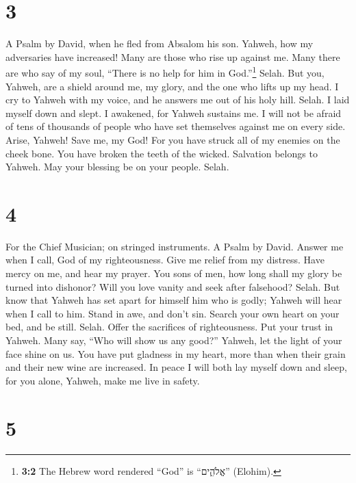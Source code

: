 \hypertarget{section-2}{%
\section{3}\label{section-2}}

A Psalm by David, when he fled from Absalom his son. 
Yahweh, how my adversaries have increased! Many are those who rise up
against me.  Many there are who say of my soul, ``There is
no help for him in God.''\footnote{\textbf{3:2} The Hebrew word rendered
  ``God'' is ``אֱלֹהִ֑ים'' (Elohim).} Selah.  But you,
Yahweh, are a shield around me, my glory, and the one who lifts up my
head.  I cry to Yahweh with my voice, and he answers me
out of his holy hill. Selah.  I laid myself down and
slept. I awakened, for Yahweh sustains me.  I will not be
afraid of tens of thousands of people who have set themselves against me
on every side.  Arise, Yahweh! Save me, my God! For you
have struck all of my enemies on the cheek bone. You have broken the
teeth of the wicked.  Salvation belongs to Yahweh. May
your blessing be on your people. Selah.

\hypertarget{section-3}{%
\section{4}\label{section-3}}

For the Chief Musician; on stringed instruments. A Psalm by David.
 Answer me when I call, God of my righteousness. Give me
relief from my distress. Have mercy on me, and hear my prayer.
 You sons of men, how long shall my glory be turned into
dishonor? Will you love vanity and seek after falsehood? Selah.
 But know that Yahweh has set apart for himself him who is
godly; Yahweh will hear when I call to him.  Stand in awe,
and don't sin. Search your own heart on your bed, and be still. Selah.
 Offer the sacrifices of righteousness. Put your trust in
Yahweh.  Many say, ``Who will show us any good?'' Yahweh,
let the light of your face shine on us.  You have put
gladness in my heart, more than when their grain and their new wine are
increased.  In peace I will both lay myself down and
sleep, for you alone, Yahweh, make me live in safety.

\hypertarget{section-4}{%
\section{5}\label{section-4}}

